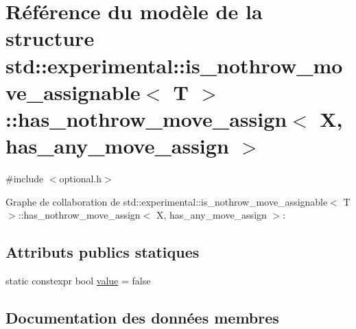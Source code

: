 \hypertarget{structstd_1_1experimental_1_1is__nothrow__move__assignable_1_1has__nothrow__move__assign}{}\section{Référence du modèle de la structure std\+:\+:experimental\+:\+:is\+\_\+nothrow\+\_\+move\+\_\+assignable$<$ T $>$\+:\+:has\+\_\+nothrow\+\_\+move\+\_\+assign$<$ X, has\+\_\+any\+\_\+move\+\_\+assign $>$}
\label{structstd_1_1experimental_1_1is__nothrow__move__assignable_1_1has__nothrow__move__assign}


{\ttfamily \#include $<$optional.\+h$>$}



Graphe de collaboration de std\+:\+:experimental\+:\+:is\+\_\+nothrow\+\_\+move\+\_\+assignable$<$ T $>$\+:\+:has\+\_\+nothrow\+\_\+move\+\_\+assign$<$ X, has\+\_\+any\+\_\+move\+\_\+assign $>$\+:
\subsection*{Attributs publics statiques}
\begin{DoxyCompactItemize}
\item 
static constexpr bool \hyperlink{structstd_1_1experimental_1_1is__nothrow__move__assignable_1_1has__nothrow__move__assign_a532e5e86417df21c93d054170894071d}{value} = false
\end{DoxyCompactItemize}


\subsection{Documentation des données membres}
\mbox{\label{structstd_1_1experimental_1_1is__nothrow__move__assignable_1_1has__nothrow__move__assign_a532e5e86417df21c93d054170894071d}} 
